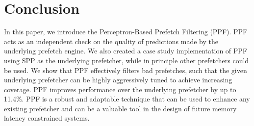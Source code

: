 \section{Conclusion}
\label{Conclusion}
In this paper, we introduce the Perceptron-Based Prefetch Filtering
(PPF).  PPF acts as an independent check on the quality of predictions
made by the underlying prefetch engine.  We also created a case study
implementation of PPF using SPP as the underlying prefetcher, while
in principle other prefetchers could be used.  We show that PPF
effectively filters bad prefetches, such that the given underlying
prefetcher can be highly aggressively tuned to achieve increasing
coverage.  PPF improves performance over the underlying 
prefetcher by up to 11.4\%.  PPF is a robust and adaptable technique 
that can be used to enhance any existing prefetcher and can be a 
valuable tool in the design of future memory latency constrained systems.
